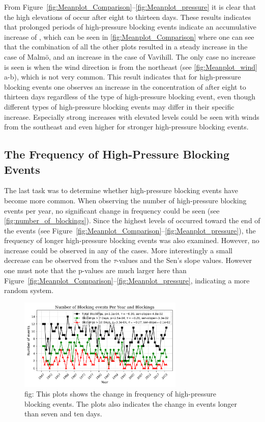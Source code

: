 From Figure~\ref{fig:Meanplot_Comparison}--\ref{fig:Meanplot_pressure} it is clear that the high elevations of \PM occur after eight to thirteen days. These results indicates that prolonged periods of high-pressure blocking events indicate an accumulative increase of \PM, which can be seen in \autoref{fig:Meanplot_Comparison} where one can see that the combination of all the other plots resulted in a steady increase in the case of Malmö, and an increase in the case of Vavihill. The only case no increase is seen is when the wind direction is from the northeast (see \autoref{fig:Meanplot_wind} a-b), which is not very common. This result indicates that for high-pressure blocking events one observes an increase in the concentration of \PM after eight to thirteen days regardless of the type of high-pressure blocking event, even though different types of high-pressure blocking events may differ in their specific increase. Especially strong increases with elevated \PM levels could be seen with winds from the southeast and even higher for stronger high-pressure blocking events. 

\subsection{The Frequency of High-Pressure Blocking Events}
The last task was to determine whether high-pressure blocking events have become more common. When observing the number of high-pressure blocking events per year, no significant change in frequency could be seen (see \autoref{fig:number_of_blockings}). Since the highest levels of \PM  occurred toward the end of the events (see Figure~\ref{fig:Meanplot_Comparison}--\ref{fig:Meanplot_pressure}), the frequency of longer high-pressure blocking events was also examined. However, no increase could be observed in any of the cases. More interestingly a small decrease can be observed from the $\tau$-values and the Sen's slope values. However one must note that the p-values are much larger here than Figure~\ref{fig:Meanplot_Comparison}--\ref{fig:Meanplot_pressure}, indicating a more random system. 

\begin{figure}[H]
    \centering
    \includegraphics[width=0.7\textwidth]{Figures/BlockingsPerYear.png}
    \caption{fig: This plots shows the change in frequency of high-pressure blocking events. The plots also indicates the change in events longer than seven and ten days. }
    \label{fig:number_of_blockings}
\end{figure}

